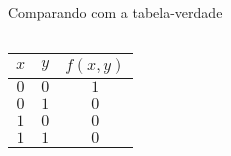 \expandafter\documentclass\expandafter[table, usenames, svgnames, dvipsnames,14pt, \classopts]{beamer}
\begin{document}
\begin{frame}{Comparando com a tabela-verdade}
\begin{columns}[c]
            \begin{center}
                \begin{table}
                    \begin{tabular}{cc|c}
                        $x$ & $y$ & $f(x,y)$\\
                        \hline
                        $0$ & $0$ & $1$\\
                        $0$ & $1$ & $0$\\
                        $1$ & $0$ & $0$\\
                        $1$ & $1$ & $0$\\
                    \end{tabular}
                \end{table}
            \end{center}
    
    \end{columns}
            
\end{frame}
\end{document}
